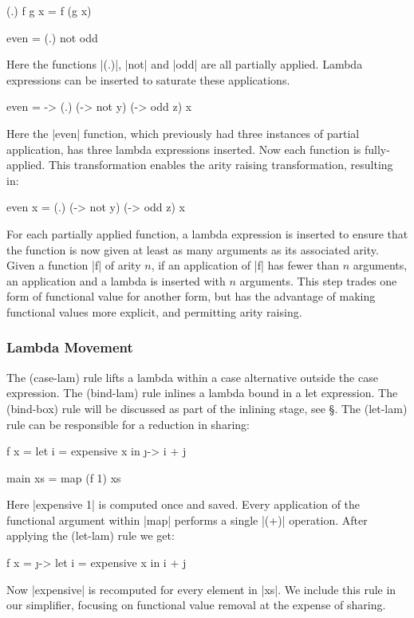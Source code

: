 \documentclass[preprint]{sigplanconf}
\begin{document}
\begin{example}
\begin{code}
(.) f g x = f (g x)

even = (.) not odd
\end{code}

\noindent Here the functions |(.)|, |not| and |odd| are all partially applied. Lambda expressions can be inserted to saturate these applications.

\begin{code}
even = \x -> (.) (\y -> not y) (\z -> odd z) x
\end{code}

\noindent Here the |even| function, which previously had three instances of partial application, has three lambda expressions inserted. Now each function is fully-applied. This transformation enables the arity raising transformation, resulting in:

\begin{code}
even x = (.) (\y -> not y) (\z -> odd z) x
\end{code}
\end{example}

For each partially applied function, a lambda expression is inserted to ensure that the function is now given at least as many arguments as its associated arity. Given a function |f| of arity $n$, if an application of |f| has fewer than $n$ arguments, an application and a lambda is inserted with $n$ arguments. This step trades one form of functional value for another form, but has the advantage of making functional values more explicit, and permitting arity raising.

\subsubsection{Lambda Movement}
\label{sec:sharing}

The (case-lam) rule lifts a lambda within a case alternative outside the case expression. The (bind-lam) rule inlines a lambda bound in a let expression. The (bind-box) rule will be discussed as part of the inlining stage, see \S\label{sec:inlining}. The (let-lam) rule can be responsible for a reduction in sharing:

\begin{example}
\begin{code}
f x =  let i = expensive x
       in \j -> i + j

main xs = map (f 1) xs
\end{code}

Here |expensive 1| is computed once and saved. Every application of the functional argument within |map| performs a single |(+)| operation. After applying the (let-lam) rule we get:

\begin{code}
f x =  \j ->  let i = expensive x
              in i + j
\end{code}

Now |expensive| is recomputed for every element in |xs|. We include this rule in our simplifier, focusing on functional value removal at the expense of sharing.
\end{example}
\end{document}
